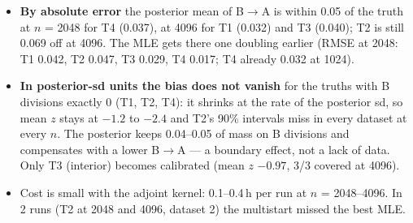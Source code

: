 \documentclass[10pt,a4paper]{article}
\newcommand{\BA}{B$\to$A}
\begin{document}
\begin{itemize}
\item \textbf{By absolute error} the posterior mean of \BA{} is within 0.05 of the truth at $n$ = 2048 for T4 (0.037), at 4096 for T1 (0.032) and T3 (0.040); T2 is still 0.069 off at 4096. The MLE gets there one doubling earlier (RMSE at 2048: T1 0.042, T2 0.047, T3 0.029, T4 0.017; T4 already 0.032 at 1024).
\item \textbf{In posterior-sd units the bias does not vanish} for the truths with B divisions exactly 0 (T1, T2, T4): it shrinks at the rate of the posterior sd, so mean $z$ stays at $-1.2$ to $-2.4$ and T2's 90\% intervals miss in every dataset at every $n$. The posterior keeps 0.04--0.05 of mass on B divisions and compensates with a lower \BA{} --- a boundary effect, not a lack of data. Only T3 (interior) becomes calibrated (mean $z$ $-0.97$, 3/3 covered at 4096).
\item Cost is small with the adjoint kernel: 0.1--0.4\,h per run at $n$ = 2048--4096. In 2 runs (T2 at 2048 and 4096, dataset 2) the multistart missed the best MLE.
\end{itemize}
\end{document}
